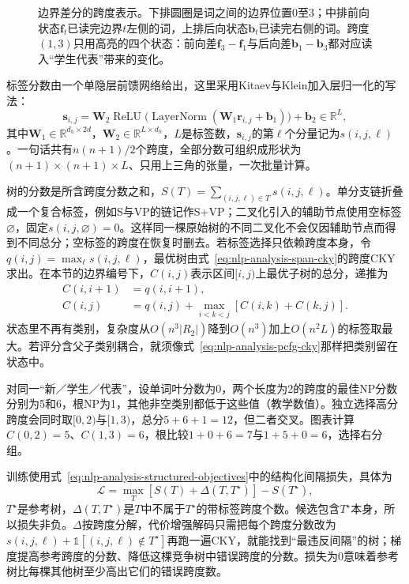\begin{figure}[htbp]
  \centering
  
  \caption{边界差分的跨度表示。下排圆圈是词之间的边界位置0至3；中排前向状态$\bm f_t$已读完边界$t$左侧的词，上排后向状态$\bm b_t$已读完右侧的词。跨度$(1,3)$只用高亮的四个状态：前向差$\bm f_3-\bm f_1$与后向差$\bm b_1-\bm b_3$都对应读入“学生代表”带来的变化。}
  \label{fig:nlp-analysis-span-difference}
\end{figure}

标签分数由一个单隐层前馈网络给出，这里采用Kitaev与Klein加入层归一化的写法：
\begin{equation}
 \bm s_{i,j}=\bm W_2
  \operatorname{ReLU}\!\bigl(
   \operatorname{LayerNorm}(\bm W_1\bm r_{i,j}+\bm b_1)
  \bigr)+\bm b_2\in\mathbb R^{L},
 \label{eq:nlp-analysis-span-label}
\end{equation}
其中$\bm W_1\in\mathbb R^{d_h\times2d}$，$\bm W_2\in\mathbb R^{L\times d_h}$，$L$是标签数，$\bm s_{i,j}$的第$\ell$个分量记为$s(i,j,\ell)$。一句话共有$n(n+1)/2$个跨度，全部分数可组织成形状为$(n+1)\times(n+1)\times L$、只用上三角的张量，一次批量计算。

树的分数是所含跨度分数之和，$S(T)=\sum_{(i,j,\ell)\in T}s(i,j,\ell)$。单分支链折叠成一个复合标签，例如S与VP的链记作S+VP；二叉化引入的辅助节点使用空标签$\varnothing$，固定$s(i,j,\varnothing)=0$。这样同一棵原始树的不同二叉化不会仅因辅助节点而得到不同总分；空标签的跨度在恢复时删去。若标签选择只依赖跨度本身，令$q(i,j)=\max_\ell s(i,j,\ell)$，最优树由式~\eqref{eq:nlp-analysis-span-cky}的跨度CKY求出。在本节的边界编号下，$C(i,j)$表示区间$[i,j)$上最优子树的总分，递推为
\begin{align}
 C(i,i+1)&=q(i,i+1),\nonumber\\
 C(i,j)&=q(i,j)+\max_{i<k<j}[C(i,k)+C(k,j)].
 \label{eq:nlp-analysis-neural-cky}
\end{align}
状态里不再有类别，复杂度从$O(n^3|R_2|)$降到$O(n^3)$加上$O(n^2L)$的标签取最大。若评分含父子类别耦合，就须像式~\eqref{eq:nlp-analysis-pcfg-cky}那样把类别留在状态中。

对同一“新／学生／代表”，设单词叶分数为0，两个长度为2的跨度的最佳NP分数分别为5和6，根NP为1，其他非空类别都低于这些值（教学数值）。独立选择高分跨度会同时取$[0,2)$与$[1,3)$，总分$5+6+1=12$，但二者交叉。图表计算$C(0,2)=5$、$C(1,3)=6$，根比较$1+0+6=7$与$1+5+0=6$，选择右分组。

训练使用式~\eqref{eq:nlp-analysis-structured-objectives}中的结构化间隔损失，具体为
\begin{equation}
 \mathcal L=\max_T[S(T)+\Delta(T,T^\star)]-S(T^\star),
 \label{eq:nlp-analysis-parse-hinge}
\end{equation}
$T^\star$是参考树，$\Delta(T,T^\star)$是$T$中不属于$T^\star$的带标签跨度个数。候选包含$T^\star$本身，所以损失非负。$\Delta$按跨度分解，代价增强解码只需把每个跨度分数改为$s(i,j,\ell)+\mathbb 1[(i,j,\ell)\notin T^\star]$再跑一遍CKY，就能找到“最违反间隔”的树；梯度提高参考跨度的分数、降低这棵竞争树中错误跨度的分数。损失为0意味着参考树比每棵其他树至少高出它们的错误跨度数。

